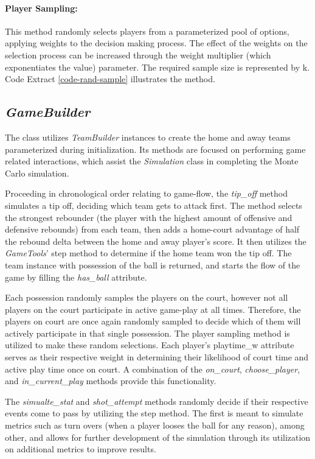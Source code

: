 \documentclass{thesis-ekf}
\theoremstyle{definition}
\theoremstyle{remark}
\begin{document}
\paragraph{Player Sampling:} This method randomly selects players from a parameterized pool of options, applying weights to the decision making process. The effect of the weights on the selection process can be increased through the weight multiplier (which exponentiates the value) parameter. The required sample size is represented by k. Code Extract \ref{code-rand-sample} illustrates the method.



\subsection{\emph{GameBuilder}}
The class utilizes \emph{TeamBuilder} instances to create the home and away teams parameterized during initialization. Its methods are focused on performing game related interactions, which assist the \emph{Simulation} class in completing the Monte Carlo simulation. 

Proceeding in chronological order relating to game-flow, the \emph{tip\_off} method simulates a tip off, deciding which team gets to attack first. The method selects the strongest rebounder (the player with the highest amount of offensive and defensive rebounds) from each team, then adds a home-court advantage of half the rebound delta between the home and away player's score. It then utilizes the \emph{GameTools}' step method to determine if the home team won the tip off. The team instance with possession of the ball is returned, and starts the flow of the game by filling the \emph{has\_ball} attribute.

Each possession randomly samples the players on the court, however not all players on the court participate in active game-play at all times. Therefore, the players on court are once again randomly sampled to decide which of them will actively participate in that single possession. The player sampling method is utilized to make these random selections. Each player's playtime\_w attribute serves as their respective weight in determining their likelihood of court time and active play time once on court. A combination of the \emph{on\_court}, \emph{choose\_player}, and \emph{in\_current\_play} methods provide this functionality.

The \emph{simualte\_stat} and \emph{shot\_attempt} methods randomly decide if their respective events come to pass by utilizing the step method. The first is meant to simulate metrics such as turn overs (when a player looses the ball for any reason), among other, and allows for further development of the simulation through its utilization on additional metrics to improve results. 
\end{document}
